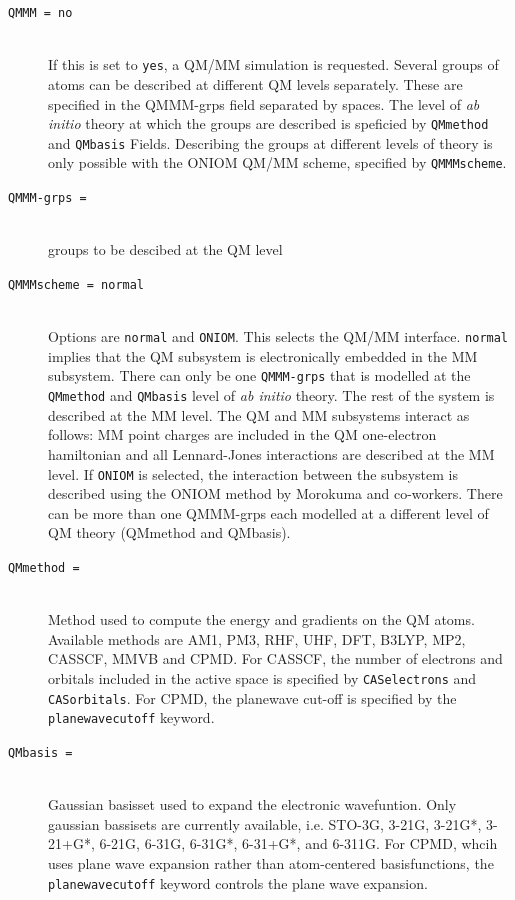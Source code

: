 \begin{description}

\item[\tt QMMM = no]\mbox{}\\ If this is set to {\tt yes}, a QM/MM
simulation is requested. Several groups of atoms can be described at
different QM levels separately. These are specified in the QMMM-grps
field separated by spaces. The level of {\it{ab initio}} theory at which the
groups are described is speficied by {\tt QMmethod} and {\tt QMbasis}
Fields. Describing the groups at different levels of theory is only
possible with the ONIOM QM/MM scheme, specified by {\tt QMMMscheme}.

\item[\tt QMMM-grps =]\mbox{}\\groups to be descibed at the QM level

\item[\tt QMMMscheme = normal]\mbox{}\\Options are {\tt normal} and
{\tt ONIOM}. This selects the QM/MM interface. {\tt normal} implies
that the QM subsystem is electronically embedded in the MM
subsystem. There can only be one {\tt QMMM-grps} that is modelled at
the {\tt QMmethod} and {\tt QMbasis} level of {\it{ ab initio}}
theory. The rest of the system is described at the MM level. The QM
and MM subsystems interact as follows: MM point charges are included
in the QM one-electron hamiltonian and all Lennard-Jones interactions
are described at the MM level. If {\tt ONIOM} is selected, the
interaction between the subsystem is described using the ONIOM method
by Morokuma and co-workers. There can be more than one QMMM-grps each
modelled at a different level of QM theory (QMmethod and QMbasis).

\item[\tt QMmethod = ]\mbox{}\\Method used to compute the energy
and gradients on the QM atoms. Available methods are AM1, PM3, RHF,
UHF, DFT, B3LYP, MP2, CASSCF, MMVB and CPMD. For CASSCF, the number of
electrons and orbitals included in the active space is specified by
{\tt CASelectrons} and {\tt CASorbitals}. For CPMD, the planewave
cut-off is specified by the {\tt planewavecutoff} keyword.

\item[\tt QMbasis = ]\mbox{}\\Gaussian basisset used to expand the
electronic wavefuntion. Only gaussian bassisets are currently
available, i.e. STO-3G, 3-21G, 3-21G*, 3-21+G*, 6-21G, 6-31G, 6-31G*,
6-31+G*, and 6-311G. For CPMD, whcih uses plane wave expansion rather
than atom-centered basisfunctions, the {\tt planewavecutoff} keyword
controls the plane wave expansion.


\end{description}
